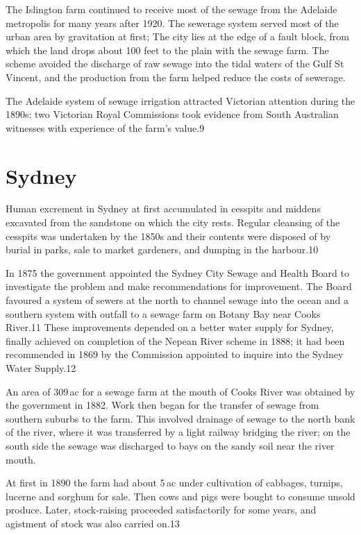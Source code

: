 The Islington farm continued to receive most of the sewage from the
Adelaide metropolis for many years after 1920.  The sewerage system
served most of the urban area by gravitation at first; The city lies
at the edge of a fault block, from which the land drops about 100 feet
to the plain with the sewage farm.  The scheme avoided the discharge
of raw sewage into the tidal waters of the Gulf St Vincent, and the
production from the farm helped reduce the costs of sewerage.

The Adelaide system of sewage irrigation attracted Victorian attention
during the 1890s: two Victorian Royal Commissions took evidence from
South Australian witnesses with experience of the farm's value.9

\section{Sydney}

Human excrement in Sydney at first accumulated in cesspits and middens
excavated from the sandstone on which the city rests.  Regular
cleansing of the cesspits was undertaken by the 1850s and their
contents were disposed of by burial in parks, sale to market
gardeners, and dumping in the harbour.10

In 1875 the government appointed the Sydney City Sewage and Health
Board to investigate the problem and make recommendations for
improvement.  The Board favoured a system of sewers at the north to
channel sewage into the ocean and a southern system with outfall to a
sewage farm on Botany Bay near Cooks River.11 These improvements
depended on a better water supply for Sydney, finally achieved on
completion of the Nepean River scheme in 1888; it had been recommended
in 1869 by the Commission appointed to inquire into the Sydney Water
Supply.12

An area of 309\,ac for a sewage farm at the mouth of Cooks River was
obtained by the government in 1882.  Work then began for the transfer
of sewage from southern suburbs to the farm.  This involved drainage
of sewage to the north bank of the river, where it was transferred by
a light railway bridging the river; on the south side the sewage was
discharged to bays on the sandy soil near the river mouth.

At first in 1890 the farm had about 5\,ac under cultivation of
cabbages, turnips, lucerne and sorghum for sale.  Then cows and pigs
were bought to consume unsold produce.  Later, stock-raising proceeded
satisfactorily for some years, and agistment of stock was also carried
on.13

